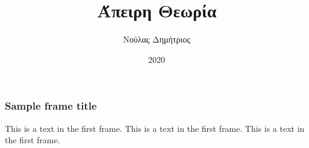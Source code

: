 \documentclass{beamer}
\title{Άπειρη Θεωρία \tl{Galois}}
\author{Νούλας Δημήτριος}
\institute{Εθνικό και Καποδιστριακό Πανεπιστήμιο Αθηνών}
\date{2020}
\begin{document}
\frame{\titlepage}

\begin{frame}
\frametitle{Sample frame title}
This is a text in the first frame. This is a text in the first frame. This is a text in the first frame.
\end{frame}
\end{document}
